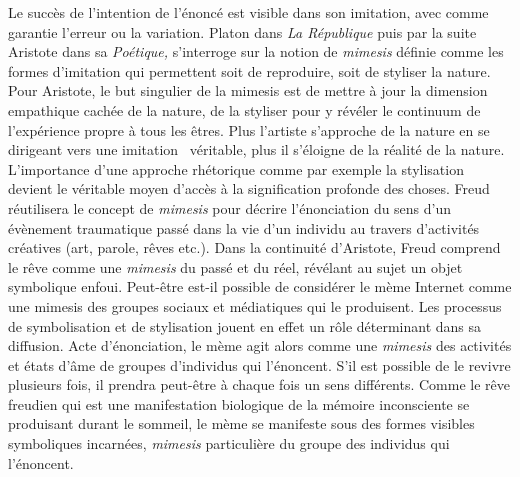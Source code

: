 {{Le succ\`es de l{\textquoteright}intention de
l{\textquoteright}\'enonc\'e est visible dans son imitation, avec comme
garantie l{\textquoteright}erreur ou la variation. Platon dans
\textit{La R\'epublique} puis par la suite Aristote dans sa
\textit{Po\'etique,} s{\textquoteright}interroge sur la notion de
\textit{mimesis} d\'efinie comme les formes d{\textquoteright}imitation
qui permettent soit de reproduire, soit de styliser la nature. Pour
Aristote, le but singulier de la mimesis est de mettre \`a jour la
dimension empathique cach\'ee de la nature, de la styliser pour y
r\'ev\'eler le continuum de l{\textquoteright}exp\'erience propre \`a
tous les \^etres. Plus l{\textquoteright}artiste
s{\textquoteright}approche de la nature en se dirigeant vers une
imitation {\guillemotleft}~v\'eritable{\guillemotright}, plus il
s{\textquoteright}\'eloigne de la r\'ealit\'e de la nature.
L{\textquoteright}importance d{\textquoteright}une approche
rh\'etorique comme par exemple la stylisation devient le v\'eritable
moyen d{\textquoteright}acc\`es \`a la signification profonde des
choses. Freud r\'eutilisera le concept de \textit{mimesis} pour
d\'ecrire l{\textquoteright}\'enonciation du sens d{\textquoteright}un
\'ev\`enement traumatique pass\'e dans la vie d{\textquoteright}un
individu au travers d{\textquoteright}activit\'es cr\'eatives (art,
parole, r\^eves etc.). Dans la continuit\'e d{\textquoteright}Aristote,
Freud comprend le r\^eve comme une \textit{mimesis} du pass\'e et du
r\'eel, r\'ev\'elant au sujet un objet symbolique enfoui. Peut-\^etre
est-il possible de consid\'erer le m\`eme Internet comme une mimesis
des groupes sociaux et m\'ediatiques qui le produisent. Les processus
de symbolisation et de stylisation jouent en effet un r\^ole
d\'eterminant dans sa diffusion. Acte d{\textquoteright}\'enonciation,
le m\`eme agit alors comme une \textit{mimesis} des activit\'es et
\'etats d{\textquoteright}\^ame de groupes d{\textquoteright}individus
qui l{\textquoteright}\'enoncent. S{\textquoteright}il est possible de
le revivre plusieurs fois, il prendra peut-\^etre \`a chaque fois un
sens diff\'erents. Comme le r\^eve freudien qui est une manifestation
biologique de la m\'emoire inconsciente se produisant durant le
sommeil, le m\`eme se manifeste sous des formes visibles symboliques
incarn\'ees, \textit{mimesis} particuli\`ere du groupe des individus
qui l{\textquoteright}\'enoncent.

}}
